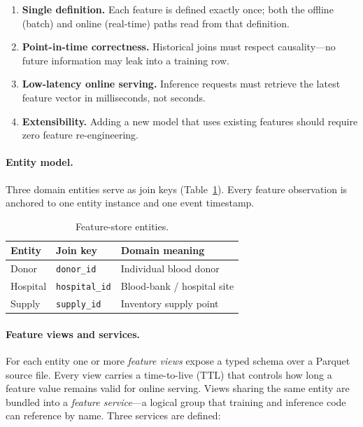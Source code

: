 \begin{enumerate}
\item \textbf{Single definition.} Each feature is defined exactly once;
      both the offline (batch) and online (real-time) paths read from that
      definition.
\item \textbf{Point-in-time correctness.} Historical joins must respect
      causality—no future information may leak into a training row.
\item \textbf{Low-latency online serving.} Inference requests must
      retrieve the latest feature vector in milliseconds, not seconds.
\item \textbf{Extensibility.} Adding a new model that uses existing
      features should require zero feature re-engineering.
\end{enumerate}

\paragraph{Entity model.}

Three domain entities serve as join keys
(Table~\ref{tab:feast-entities}).  Every feature observation is anchored
to one entity instance and one event timestamp.

\begin{table}[htbp]
\centering
\caption{Feature-store entities.}
\label{tab:feast-entities}
\small
\begin{tabular}{@{}lll@{}}
\toprule
\textbf{Entity} & \textbf{Join key} & \textbf{Domain meaning} \\
\midrule
Donor      & \texttt{donor\_id}    & Individual blood donor \\
Hospital   & \texttt{hospital\_id} & Blood-bank / hospital site \\
Supply     & \texttt{supply\_id}   & Inventory supply point \\
\bottomrule
\end{tabular}
\end{table}

\paragraph{Feature views and services.}

For each entity one or more \emph{feature views} expose a typed schema
over a Parquet source file.  Every view carries a time-to-live (TTL) that
controls how long a feature value remains valid for online serving.
Views sharing the same entity are bundled into a \emph{feature service}—a
logical group that training and inference code can reference by name.
Three services are defined:

